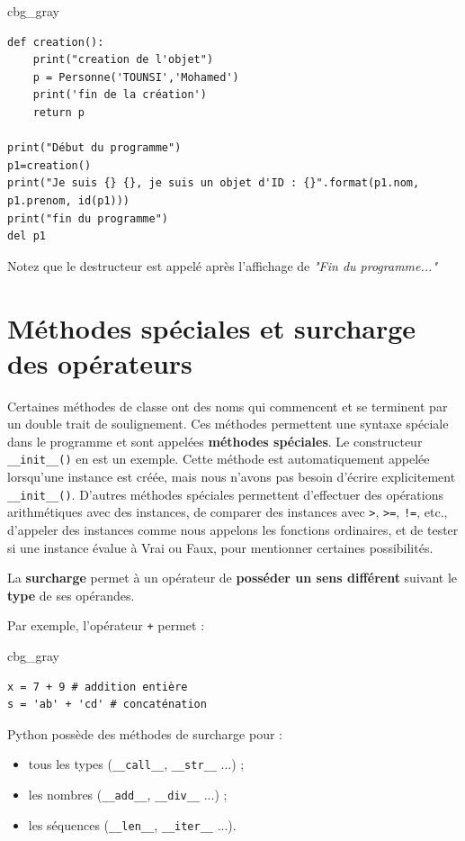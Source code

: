 \documentclass[%
oneside,                 %
final,                   %
10pt]{article}
\newenvironment{_cod_tight}[1]{
   \def\FrameCommand{\colorbox{#1}}
   \FrameRule0.6pt\MakeFramed {\FrameRestore}\vskip3mm}
   {\vskip0mm\endMakeFramed}
\newenvironment{cod}[1]{
\bgroup\rmfamily
\fboxsep=0mm\relax
\begin{_cod_tight}{#1}
\list{}{\parsep=-2mm\parskip=0mm\topsep=0pt\leftmargin=2mm
\rightmargin=2\leftmargin\leftmargin=4pt\relax}
\item\relax}
{\endlist\end{_cod_tight}\egroup}
\begin{document}
\begin{cod}{cbg_gray}\begin{verbatim}
def creation():
    print("creation de l'objet")
    p = Personne('TOUNSI','Mohamed')
    print('fin de la création')
    return p

print("Début du programme")
p1=creation()
print("Je suis {} {}, je suis un objet d'ID : {}".format(p1.nom, p1.prenom, id(p1)))
print("fin du programme")
del p1
\end{verbatim}
\end{cod}
\noindent
Notez que le destructeur est appelé après l'affichage de \emph{"Fin du programme..."}

\section{Méthodes spéciales et surcharge des opérateurs}
Certaines méthodes de classe ont des noms qui commencent et se terminent par un double trait de soulignement. Ces méthodes permettent une syntaxe spéciale dans le programme et sont appelées \textbf{méthodes spéciales}. Le constructeur \Verb!__init__()! en est un exemple. Cette méthode est automatiquement appelée lorsqu'une instance est créée, mais nous n'avons pas besoin d'écrire explicitement \Verb!__init__()!. D'autres méthodes spéciales permettent d'effectuer des opérations arithmétiques avec des instances, de comparer des instances avec \texttt{>}, \texttt{>=}, \Verb?!=?, etc., d'appeler des instances comme nous appelons les fonctions ordinaires, et de tester si une instance évalue à Vrai ou Faux, pour mentionner certaines possibilités.

La \textbf{surcharge} permet à un opérateur de \textbf{posséder un sens différent} suivant le \textbf{type} de ses opérandes.

Par exemple, l'opérateur \texttt{+} permet :
\begin{cod}{cbg_gray}\begin{verbatim}
x = 7 + 9 # addition entière
s = 'ab' + 'cd' # concaténation
\end{verbatim}
\end{cod}
\noindent
Python possède des méthodes de surcharge pour :
\begin{itemize}
\item tous les types (\Verb!__call__!, \Verb!__str__! ...) ;

\item les nombres (\Verb!__add__!, \Verb!__div__! ...) ;

\item les séquences (\Verb!__len__!, \Verb!__iter__! ...).
\end{itemize}
\end{document}

